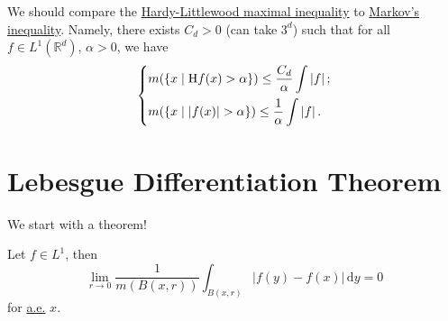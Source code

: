 We should compare the \hyperref[thm:HL-maximal-inequality]{Hardy-Littlewood maximal inequality} to \hyperref[lma:Markov-inequality]{Markov's inequality}.
Namely, there exists \(C_{d} >0\) (can take \(3^d\)) such that for all \(f\in L^1(\mathbb{R} ^d)\), \(\alpha > 0\), we have
\[
	\begin{dcases}
		m(\left\{x\mid \mathrm{H}f(x) > \alpha\right\})                \leq \frac{C_{d} }{\alpha }\int \left\vert f \right\vert; \\
		m(\left\{x\mid \left\vert f(x) \right\vert > \alpha \right\})  \leq \frac{1}{\alpha }\int \left\vert f \right\vert.
	\end{dcases}
\]

\section{Lebesgue Differentiation Theorem}
We start with a theorem!
\begin{theorem}\label{thm:Lebesgue-differentiation-theorem}
	Let \(f\in L^1\), then
	\[
		\lim\limits_{r \to 0} \frac{1}{m(B(x, r))}\int_{B(x, r)}\left\vert f(y) - f(x) \right\vert   \,\mathrm{d}y = 0
	\]
	for \hyperref[def:mu-almost-everywhere]{a.e.} \(x\).
\end{theorem}
